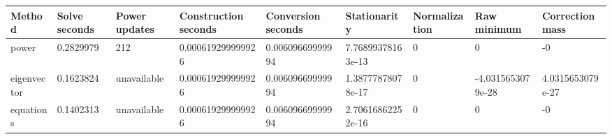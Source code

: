 \begin{tabular}{lllllllll}
\hline
Method & Solve seconds & Power updates & Construction seconds & Conversion seconds & Stationarity & Normalization & Raw minimum & Correction mass \\
\hline
power & 0.2829979 & 212 & 0.000619299999926 & 0.00609669999994 & 7.76899378163e-13 & 0 & 0 & -0 \\
eigenvector & 0.1623824 & unavailable & 0.000619299999926 & 0.00609669999994 & 1.38777878078e-17 & 0 & -4.0315653079e-28 & 4.0315653079e-27 \\
equations & 0.1402313 & unavailable & 0.000619299999926 & 0.00609669999994 & 2.70616862252e-16 & 0 & 0 & -0 \\
\hline
\end{tabular}
